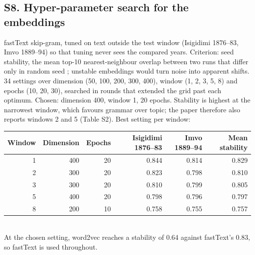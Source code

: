 \subsection*{S8. Hyper-parameter search for the embeddings}
fastText skip-gram, tuned on text outside the test window (Isigidimi 1876--83, Imvo 1889--94) so that tuning never sees the compared years. Criterion: seed stability, the mean top-10 nearest-neighbour overlap between two runs that differ only in random seed \citep{antoniak2018}; unstable embeddings would turn noise into apparent shifts. 34 settings over dimension (50, 100, 200, 300, 400), window (1, 2, 3, 5, 8) and epochs (10, 20, 30), searched in rounds that extended the grid past each optimum. Chosen: dimension 400, window 1, 20 epochs. Stability is highest at the narrowest window, which favours grammar over topic; the paper therefore also reports windows 2 and 5 (Table S2). Best setting per window:\\[2pt]
\begin{tabular}{@{}rrrrrr@{}}
\toprule
Window & Dimension & Epochs & Isigidimi 1876--83 & Imvo 1889--94 & Mean stability \\ \midrule
1 & 400 & 20 & 0.844 & 0.814 & 0.829 \\
2 & 300 & 20 & 0.823 & 0.798 & 0.810 \\
3 & 300 & 20 & 0.810 & 0.799 & 0.805 \\
5 & 400 & 20 & 0.798 & 0.796 & 0.797 \\
8 & 200 & 10 & 0.758 & 0.755 & 0.757 \\
\bottomrule
\end{tabular}\\[2pt]
At the chosen setting, word2vec reaches a stability of 0.64 against fastText's 0.83, so fastText is used throughout.


